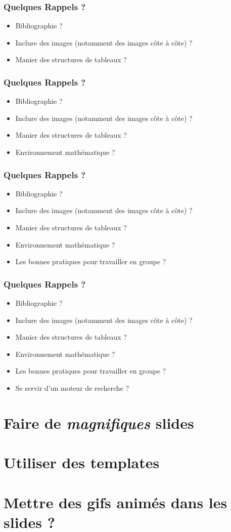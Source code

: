 \documentclass[handout]{beamer}
\begin{document}
	\begin{frame}
		\frametitle{Quelques Rappels ?}
		\begin{itemize}
			\item Bibliographie ?
			\item Inclure des images (notamment des images côte à côte) ?
			\item Manier des structures de tableaux ?
		\end{itemize}
	\end{frame}

	\begin{frame}
		\frametitle{Quelques Rappels ?}
		\begin{itemize}
			\item Bibliographie ?
			\item Inclure des images (notamment des images côte à côte) ?
			\item Manier des structures de tableaux ?
			\item Environnement mathématique ?
		\end{itemize}
	\end{frame}

	\begin{frame}
		\frametitle{Quelques Rappels ?}
		\begin{itemize}
			\item Bibliographie ?
			\item Inclure des images (notamment des images côte à côte) ?
			\item Manier des structures de tableaux ?
			\item Environnement mathématique ?
			\item Les bonnes pratiques pour travailler en groupe ?
		\end{itemize}
	\end{frame}

	\begin{frame}
		\frametitle{Quelques Rappels ?}
		\begin{itemize}
			\item Bibliographie ?
			\item Inclure des images (notamment des images côte à côte) ?
			\item Manier des structures de tableaux ?
			\item Environnement mathématique ?
			\item Les bonnes pratiques pour travailler en groupe ?
			\item Se servir d'un moteur de recherche ?
		\end{itemize}
	\end{frame}

\section{Faire de \emph{magnifiques} slides}

\section{Utiliser des templates}

\section{Mettre des gifs animés dans les slides ?}
\end{document}
